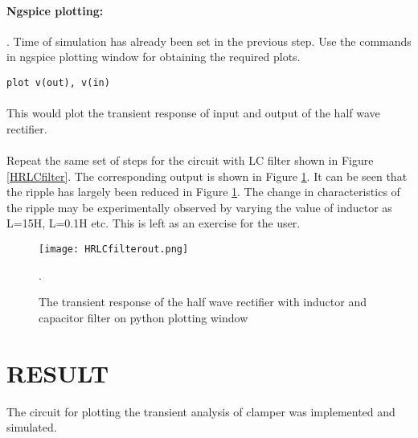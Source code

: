 \paragraph{Ngspice plotting:}. Time of simulation has already been set in the previous step. Use the commands in ngspice plotting window for obtaining the required plots.

\texttt{plot v(out), v(in) }

\paragraph{}

This would plot the transient response of input and output of the half wave rectifier. 

\paragraph{}Repeat the same set of steps for the circuit with LC filter shown in Figure \ref{HRLCfilter}. The corresponding output is shown in Figure \ref{HRLCfilterout}.  It can be seen that the ripple has largely been reduced in Figure \ref{HRLCfilterout}. The change in characteristics of the ripple may be experimentally observed by varying the value of inductor as L=15H, L=0.1H etc. This is left as an exercise for the user.

\begin{figure}[h]
\centering
\texttt{[image: HRLCfilterout.png]}
\caption{The transient response of the half wave rectifier with inductor and capacitor filter on python plotting window}
\label{HRLCfilterout}.
\end{figure}

\section*{RESULT}
The circuit for plotting the transient analysis of clamper was implemented and simulated.


